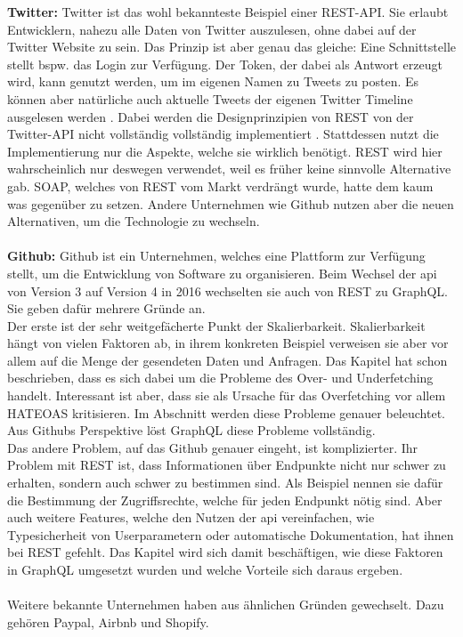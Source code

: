 \textbf{Twitter:} Twitter ist das wohl bekannteste Beispiel einer REST-API. Sie erlaubt Entwicklern, nahezu alle Daten von Twitter auszulesen, ohne dabei auf der Twitter Website zu sein. Das Prinzip ist aber genau das gleiche: Eine Schnittstelle stellt bspw. das Login zur Verfügung. Der Token, der dabei als Antwort erzeugt wird, kann genutzt werden, um im eigenen Namen zu Tweets zu posten. Es können aber natürliche auch aktuelle Tweets der eigenen Twitter Timeline ausgelesen werden \parencite{Twitter2020}. Dabei werden die Designprinzipien von \ac{REST} von der Twitter-API nicht vollständig vollständig implementiert \parencite{Ullenboom2017}. Stattdessen nutzt die Implementierung nur die Aspekte, welche sie wirklich benötigt. \ac{REST} wird hier wahrscheinlich nur deswegen verwendet, weil es früher keine sinnvolle Alternative gab. \ac{SOAP}, welches von \ac{REST} vom Markt verdrängt wurde, hatte dem kaum was gegenüber zu setzen. Andere Unternehmen wie Github nutzen aber die neuen Alternativen, um die Technologie zu wechseln.\\
\\
\textbf{Github:} Github ist ein Unternehmen, welches eine Plattform zur Verfügung stellt, um die Entwicklung von Software zu organisieren. Beim Wechsel der \ac{api} von Version 3 auf Version 4 in 2016 wechselten sie auch von \ac{REST} zu GraphQL. Sie geben dafür mehrere Gründe an.\\
Der erste ist der sehr weitgefächerte Punkt der Skalierbarkeit. Skalierbarkeit hängt von vielen Faktoren ab, in ihrem konkreten Beispiel verweisen sie aber vor allem auf die Menge der gesendeten Daten und Anfragen. Das Kapitel  hat schon beschrieben, dass es sich dabei um die Probleme des Over- und Underfetching handelt. Interessant ist aber, dass sie als Ursache für das Overfetching vor allem \ac{HATEOAS} kritisieren. Im Abschnitt  werden diese Probleme genauer beleuchtet. Aus Githubs Perspektive löst GraphQL diese Probleme vollständig.\\
Das andere Problem, auf das Github genauer eingeht, ist komplizierter. Ihr Problem mit \ac{REST} ist, dass Informationen über Endpunkte nicht nur schwer zu erhalten, sondern auch schwer zu bestimmen sind. Als Beispiel nennen sie dafür die Bestimmung der Zugriffsrechte, welche für jeden Endpunkt nötig sind. Aber auch weitere Features, welche den Nutzen der \ac{api} vereinfachen, wie Typesicherheit von Userparametern oder automatische Dokumentation, hat ihnen bei \ac{REST} gefehlt. Das Kapitel  wird sich damit beschäftigen, wie diese Faktoren in GraphQL umgesetzt wurden und welche Vorteile sich daraus ergeben. \parencite{Github2020}
\\
\\
Weitere bekannte Unternehmen haben aus ähnlichen Gründen gewechselt. Dazu gehören Paypal, Airbnb und Shopify.

